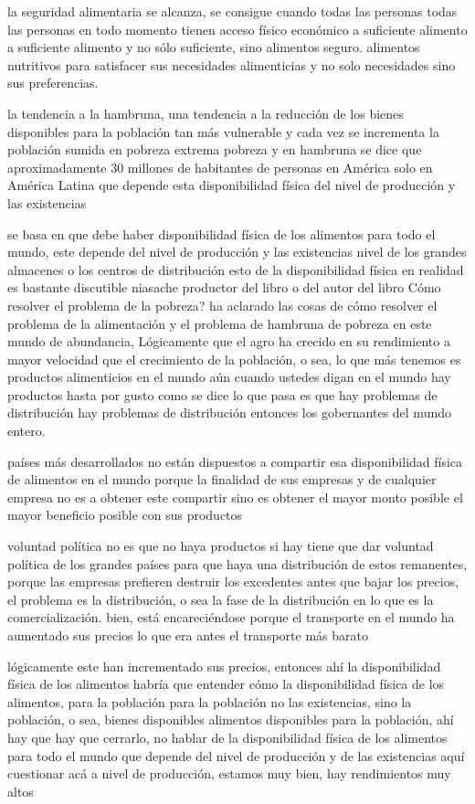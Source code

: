 \documentclass[
  a4paper,
]{article}
\begin{document}
la seguridad alimentaria se alcanza, se consigue cuando todas las
personas todas las personas en todo momento tienen acceso físico
económico a suficiente alimento a suficiente alimento y no sólo
suficiente, sino alimentos seguro. alimentos nutritivos para satisfacer
sus necesidades alimenticias y no solo necesidades sino sus
preferencias.

la tendencia a la hambruna, una tendencia a la reducción de los bienes
disponibles para la población tan más vulnerable y cada vez se
incrementa la población sumida en pobreza extrema pobreza y en hambruna
se dice que aproximadamente 30 millones de habitantes de personas en
América solo en América Latina que depende esta disponibilidad física
del nivel de producción y las existencias

se basa en que debe haber disponibilidad física de los alimentos para
todo el mundo, este depende del nivel de producción y las existencias
nivel de los grandes almacenes o los centros de distribución esto de la
disponibilidad física en realidad es bastante discutible niasache
productor del libro o del autor del libro Cómo resolver el problema de
la pobreza? ha aclarado las cosas de cómo resolver el problema de la
alimentación y el problema de hambruna de pobreza en este mundo de
abundancia, Lógicamente que el agro ha crecido en su rendimiento a mayor
velocidad que el crecimiento de la población, o sea, lo que más tenemos
es productos alimenticios en el mundo aún cuando ustedes digan en el
mundo hay productos hasta por gusto como se dice lo que pasa es que hay
problemas de distribución hay problemas de distribución entonces los
gobernantes del mundo entero.

países más desarrollados no están dispuestos a compartir esa
disponibilidad física de alimentos en el mundo porque la finalidad de
sus empresas y de cualquier empresa no es a obtener este compartir sino
es obtener el mayor monto posible el mayor beneficio posible con sus
productos

voluntad política no es que no haya productos si hay tiene que dar
voluntad política de los grandes países para que haya una distribución
de estos remanentes, porque las empresas prefieren destruir los
excedentes antes que bajar los precios, el problema es la distribución,
o sea la fase de la distribución en lo que es la comercialización. bien,
está encareciéndose porque el transporte en el mundo ha aumentado sus
precios lo que era antes el transporte más barato

lógicamente este han incrementado sus precios, entonces ahí la
disponibilidad física de los alimentos habría que entender cómo la
disponibilidad física de los alimentos, para la población para la
población no las existencias, sino la población, o sea, bienes
disponibles alimentos disponibles para la población, ahí hay que hay que
cerrarlo, no hablar de la disponibilidad física de los alimentos para
todo el mundo que depende del nivel de producción y de las existencias
aquí cuestionar acá a nivel de producción, estamos muy bien, hay
rendimientos muy altos
\end{document}
